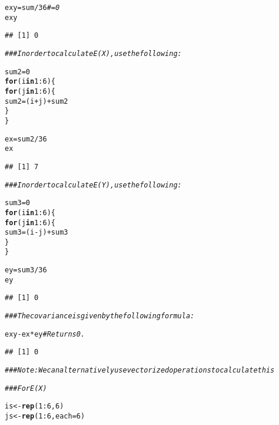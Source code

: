 \documentclass[12pt,letter]{article}\usepackage[]{graphicx}\usepackage[]{color}
\makeatletter
\newcommand{\hlnum}[1]{\textcolor[rgb]{0.686,0.059,0.569}{#1}}%
\newcommand{\hlcom}[1]{\textcolor[rgb]{0.678,0.584,0.686}{\textit{#1}}}%
\newcommand{\hlopt}[1]{\textcolor[rgb]{0,0,0}{#1}}%
\newcommand{\hlstd}[1]{\textcolor[rgb]{0.345,0.345,0.345}{#1}}%
\newcommand{\hlkwa}[1]{\textcolor[rgb]{0.161,0.373,0.58}{\textbf{#1}}}%
\newcommand{\hlkwb}[1]{\textcolor[rgb]{0.69,0.353,0.396}{#1}}%
\newcommand{\hlkwc}[1]{\textcolor[rgb]{0.333,0.667,0.333}{#1}}%
\newcommand{\hlkwd}[1]{\textcolor[rgb]{0.737,0.353,0.396}{\textbf{#1}}}%
\newenvironment{kframe}{%
 \def\at@end@of@kframe{}%
 \ifinner\ifhmode%
  \def\at@end@of@kframe{\end{minipage}}%
  \begin{minipage}{\columnwidth}%
 \fi\fi%
 \def\FrameCommand##1{\hskip\@totalleftmargin \hskip-\fboxsep
 \colorbox{shadecolor}{##1}\hskip-\fboxsep
     \hskip-\linewidth \hskip-\@totalleftmargin \hskip\columnwidth}%
 \MakeFramed {\advance\hsize-\width
   \@totalleftmargin\z@ \linewidth\hsize
   \@setminipage}}%
 {\par\unskip\endMakeFramed%
 \at@end@of@kframe}
\newenvironment{knitrout}{}{} %
\makeatother
\begin{document}
\begin{knitrout}
\color{fgcolor}\begin{kframe}
\begin{alltt}
\hlstd{exy} \hlkwb{=} \hlstd{sum}\hlopt{/}\hlnum{36}  \hlcom{# = 0}
\hlstd{exy}
\end{alltt}
\begin{verbatim}
## [1] 0
\end{verbatim}
\begin{alltt}
\hlcom{### In order to calculate E(X), use the following:}

\hlstd{sum2} \hlkwb{=} \hlnum{0}
\hlkwa{for} \hlstd{(i} \hlkwa{in} \hlnum{1}\hlopt{:}\hlnum{6}\hlstd{) \{}
    \hlkwa{for} \hlstd{(j} \hlkwa{in} \hlnum{1}\hlopt{:}\hlnum{6}\hlstd{) \{}
        \hlstd{sum2} \hlkwb{=} \hlstd{(i} \hlopt{+} \hlstd{j)} \hlopt{+} \hlstd{sum2}
    \hlstd{\}}
\hlstd{\}}

\hlstd{ex} \hlkwb{=} \hlstd{sum2}\hlopt{/}\hlnum{36}
\hlstd{ex}
\end{alltt}
\begin{verbatim}
## [1] 7
\end{verbatim}
\begin{alltt}
\hlcom{### In order to calculate E(Y), use the following:}

\hlstd{sum3} \hlkwb{=} \hlnum{0}
\hlkwa{for} \hlstd{(i} \hlkwa{in} \hlnum{1}\hlopt{:}\hlnum{6}\hlstd{) \{}
    \hlkwa{for} \hlstd{(j} \hlkwa{in} \hlnum{1}\hlopt{:}\hlnum{6}\hlstd{) \{}
        \hlstd{sum3} \hlkwb{=} \hlstd{(i} \hlopt{-} \hlstd{j)} \hlopt{+} \hlstd{sum3}
    \hlstd{\}}
\hlstd{\}}

\hlstd{ey} \hlkwb{=} \hlstd{sum3}\hlopt{/}\hlnum{36}
\hlstd{ey}
\end{alltt}
\begin{verbatim}
## [1] 0
\end{verbatim}
\begin{alltt}
\hlcom{### The covariance is given by the following formula:}

\hlstd{exy} \hlopt{-} \hlstd{ex} \hlopt{*} \hlstd{ey}  \hlcom{# Returns 0.}
\end{alltt}
\begin{verbatim}
## [1] 0
\end{verbatim}
\begin{alltt}
\hlcom{### Note: We can alternatively use vectorized operations to calculate this}

\hlcom{### For E(X)}

\hlstd{is} \hlkwb{<-} \hlkwd{rep}\hlstd{(}\hlnum{1}\hlopt{:}\hlnum{6}\hlstd{,} \hlnum{6}\hlstd{)}
\hlstd{js} \hlkwb{<-} \hlkwd{rep}\hlstd{(}\hlnum{1}\hlopt{:}\hlnum{6}\hlstd{,} \hlkwc{each} \hlstd{=} \hlnum{6}\hlstd{)}


\end{alltt}
\end{kframe}
\end{knitrout}
\end{document}
